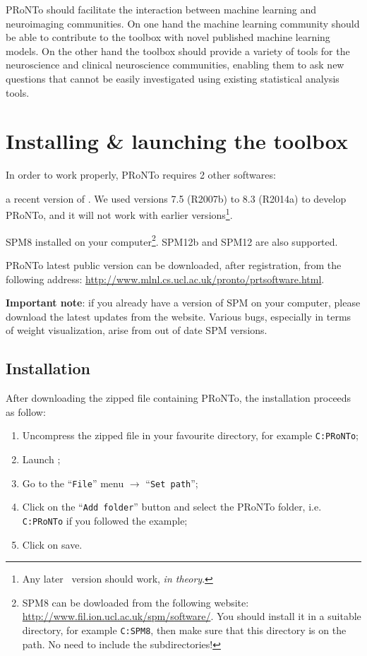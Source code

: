 PRoNTo should facilitate the interaction between machine learning and neuroimaging communities. On one hand the machine learning community should be able to contribute to the toolbox with novel published machine learning models. On the other hand the toolbox should provide a variety of tools for the neuroscience and clinical neuroscience communities, enabling them to ask new questions that cannot be easily investigated using existing statistical analysis tools. 


\section{Installing \& launching the toolbox}
\label{sec:Installation}

In order to work properly, PRoNTo requires 2 other softwares:
\bi
\item a recent version of \matlab. We used versions 7.5 (R2007b) to 8.3 (R2014a) to develop PRoNTo, and it will not work with earlier versions\footnote{Any later \matlab~version should work, {\it in theory}.}. 
\item SPM8\cite{SPM8} installed on your computer\footnote{SPM8 can be dowloaded from the following website: \url{http://www.fil.ion.ucl.ac.uk/spm/software/}. You should install it in a suitable directory, for example {\tt C:\bslash SPM8\bslash }, then make sure that this directory is on the \matlab path. No need to include the subdirectories!}. SPM12b and SPM12 are also supported.
\ei

PRoNTo latest public version can be downloaded, after registration, from the following address: \url{http://www.mlnl.cs.ucl.ac.uk/pronto/prtsoftware.html}.

\textbf{Important note}: if you already have a version of SPM on your computer, please download the latest updates from the website. Various bugs, especially in terms of weight visualization, arise from out of date SPM versions.

\subsection{Installation}

After downloading the zipped file containing PRoNTo, the installation proceeds as follow:
\begin{enumerate}\addtolength{\itemsep}{-1\baselineskip}
\item	Uncompress the zipped file in your favourite directory, for example {\tt C:\bslash PRoNTo\bslash };\\
\item	Launch \matlab ;\\
\item	Go to the ``{\tt File}'' menu $\rightarrow$ ``{\tt Set path}'';\\
\item	Click on the ``{\tt Add folder}'' button and select the PRoNTo folder, i.e. {\tt C:\bslash PRoNTo\bslash } if you followed the example;\\
\item	Click on save.
\end{enumerate}

